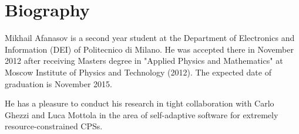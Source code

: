 \section{Biography}

Mikhail Afanasov is a second year student at the Department of Electronics and
Information (DEI) of Politecnico di Milano. He was accepted there in November
2012 after receiving Masters degree in "Applied Physics and Mathematics" at
Moscow Institute of Physics and Technology (2012). The expected date of
graduation is November 2015.

He has a pleasure to conduct his research in tight collaboration with Carlo
Ghezzi and Luca Mottola in the area of self-adaptive software for
extremely resource-constrained CPSs.
